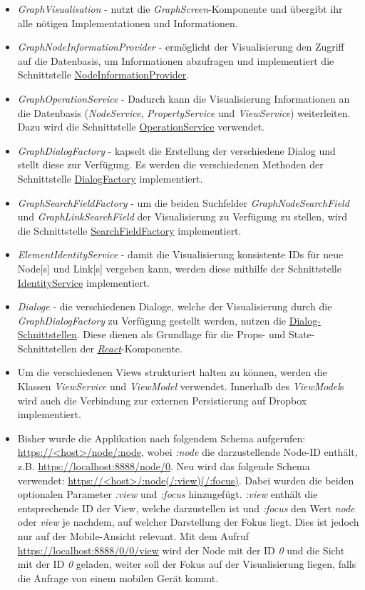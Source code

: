 \begin{itemize}
    \item \textit{GraphVisualisation} - nutzt die \textit{GraphScreen}-Komponente und üb\-er\-gi\-bt ihr alle nötigen Implementationen und Informationen. 
    \item \textit{GraphNodeInformationProvider} - ermöglicht der Visualisierung den Zugriff auf die Datenbasis, um Informationen abzufragen und implementiert die Schnittstelle \hyperref[NodeInformationProvider]{NodeInformationProvider}.
    \item \textit{GraphOperationService} - Dadurch kann die Visualisierung Informationen an die Datenbasis (\textit{NodeService}, \textit{PropertyService} und \textit{ViewService}) weiterleiten. Dazu wird die Schnittstelle \hyperref[OperationService]{OperationService} verwendet.
    \item \textit{GraphDialogFactory} - kapselt die Erstellung der verschiedene Dialog und stellt diese zur Verfügung. Es werden die verschiedenen Methoden der Schnittstelle \hyperref[DialogFactory]{DialogFactory} implementiert.
    \item \textit{GraphSearchFieldFactory} - um die beiden Suchfelder \textit{GraphNodeSearchField} und \textit{GraphLinkSearchField} der Visualisierung zu Ver\-füg\-ung zu stellen, wird die Schnittstelle \hyperref[SearchFieldFactory]{SearchFieldFactory} implementiert.
    \item \textit{ElementIdentityService} - damit die Visualisierung konsistente IDs für neue \gls{Node}[s] und \gls{Link}[s] vergeben kann, werden diese mithilfe der Schnittstelle \hyperref[IdentityService]{IdentityService} implementiert.
    \item \textit{Dialoge} - die verschiedenen Dialoge, welche der Visualisierung durch die \textit{GraphDialogFactory} zu Verfügung gestellt werden, nutzen die \hyperref[subsec:dialoginterfaces]{Dialog-Schnittstellen}. Diese dienen als Grundlage für die \gls{Props}- und \gls{State}-Schnittstellen der \hyperref[react]{\textit{React}}-Komponente.
    \item Um die verschiedenen \gls{View}s strukturiert halten zu können, werden die Klassen \textit{ViewService} und \textit{ViewModel} verwendet. Innerhalb des \textit{ViewModel}s wird auch die Verbindung zur externen Persistierung auf \gls{Dropbox} implementiert.
    \item Bisher wurde die Applikation nach folgendem Schema aufgerufen: \url{https://<host>/node/:node}, wobei \textit{:node} die darzustellende Node-ID enthält, z.B. \url{https://localhost:8888/node/0}. Neu wird das folgende Schema verwendet: \url{https://<host>/:node(/:view)(/:focus)}. Dabei wurden die beiden optionalen Parameter \textit{:view} und \textit{:focus} hinzugefügt. \textit{:view} enthält die entsprechende ID der View, welche darzustellen ist und \textit{:focus} den Wert \textit{node} oder \textit{view} je nachdem, auf welcher Darstellung der Fokus liegt. Dies ist jedoch nur auf der Mobile-Ansicht relevant. Mit dem Aufruf \url{https://localhost:8888/0/0/view} wird der \gls{Node} mit der ID \textit{0} und die Sicht mit der ID \textit{0} geladen, weiter soll der Fokus auf der Visualisierung liegen, falls die Anfrage von einem mobilen Gerät kommt.

\end{itemize}

